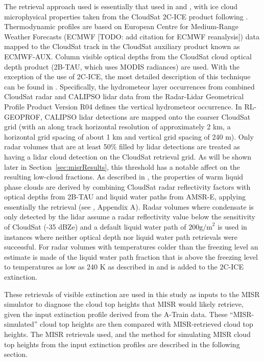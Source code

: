 The retrieval approach used is essentially that used in
\citet{mace_and_wrenn_2013} and \citet{berry_and_mace_2014}, with ice
cloud microphysical properties taken from the CloudSat 2C-ICE product
\citep{deng_et_al_2010, deng_et_al_2013} following
\citet{berry_and_mace_2014}. Thermodynamic profiles are based on
European Centre for Medium-Range Weather Forecasts (ECMWF {[}TODO: add
citation for ECMWF reanalysis{]}) data mapped to the CloudSat track in
the CloudSat auxiliary product known as ECMWF-AUX. Column visible
optical depths from the CloudSat cloud optical depth product (2B-TAU,
which uses MODIS radiances) are used. With the exception of the use of
2C-ICE, the most detailed description of this technique can be found in
\citet{mace_2010}. Specifically, the hydrometeor layer occurrences from
combined CloudSat radar and CALIPSO lidar data from the Radar-Lidar
Geometrical Profile Product
\citep[RL-GEOPROF;][]{mace_et_al_2009, mace_and_zhang_2014} Version R04
defines the vertical hydrometeor occurrence. In RL-GEOPROF, CALIPSO
lidar detections are mapped onto the coarser CloudSat grid (with an
along track horizontal resolution of approximately 2 km, a horizontal
grid spacing of about 1 km and vertical grid spacing of 240 m). Only
radar volumes that are at least 50\% filled by lidar detections are
treated as having a lidar cloud detection on the CloudSat retrieval
grid. As will be shown later in Section~\ref{sec:misrResults}, this
threshold has a notable affect on the resulting low-cloud fractions. As
described in \citet{mace_2010}, the properties of warm liquid phase
clouds are derived by combining CloudSat radar reflectivity factors with
optical depths from 2B-TAU and liquid water paths from AMSR-E, applying
essentially the \citet{dong_and_mace_2003} retrieval (see
\citet{mace_2010}, Appendix A). Radar volumes where condensate is only
detected by the lidar assume a radar reflectivity value below the
sensitivity of CloudSat (-35 dBZe) and a default liquid water path of
\(200 \textrm{g/m}^2\) is used in instances where neither optical depth
nor liquid water path retrievals were successful. For radar volumes with
temperatures colder than the freezing level an estimate is made of the
liquid water path fraction that is above the freezing level to
temperatures as low as 240 K as described in \citet{mace_et_al_2006} and
is added to the 2C-ICE extinction.

These retrievals of visible extinction are used in this study as inputs
to the MISR simulator to diagnose the cloud top heights that MISR would
likely retrieve, given the input extinction profile derived from the
A-Train data. These ``MISR-simulated'' cloud top heights are then
compared with MISR-retrieved cloud top heights. The MISR retrievals
used, and the method for simulating MISR cloud top heights from the
input extinction profiles are described in the following section.


